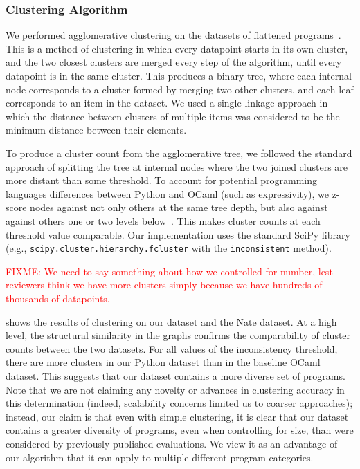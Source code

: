 \documentclass[conference]{IEEEtran}
\newcommand{\fixme}[1]{\textcolor{red}{FIXME: #1}}
\newcommand\lt[1]{{\lstinline|#1|}}
\begin{document}
\subsubsection{Clustering Algorithm}

We performed agglomerative clustering on the
datasets of flattened programs~\cite{modern-clustering}.
This is a method of clustering in which every datapoint starts in its own
cluster, and the two closest clusters are merged every step of the algorithm,
until every datapoint is in the same cluster. This produces a binary tree, where
each internal node corresponds to a cluster formed by merging two other clusters,
and each leaf corresponds to an item in the dataset. We used a single linkage
approach in which the distance between clusters of multiple items was considered
to be the minimum distance between their elements.

To produce a cluster count from the agglomerative tree, we followed the
standard approach of splitting the tree at internal nodes where the two
joined clusters are more distant than some threshold. To account for
potential programming languages differences between Python and OCaml (such
as expressivity), we z-score nodes against not only others at the same tree
depth, but also against against others one or two levels
below~\cite{inconsistent}. This makes cluster counts at each threshold
value comparable. Our implementation uses the standard
SciPy library (e.g., \lt{scipy.cluster.hierarchy.fcluster} with the
\lt{inconsistent} method).

\fixme{We need to say something about how we controlled for number, lest
reviewers think we have more clusters simply because we have hundreds of
thousands of datapoints.}

 shows the results of clustering on our dataset and the
Nate dataset. At a high level, the structural similarity in the graphs
confirms the comparability of cluster counts between the two datasets.  For
all values of the inconsistency threshold, there are more clusters in our
Python dataset than in the baseline OCaml dataset. This suggests that our
dataset contains a more diverse set of programs. Note that we are not
claiming any novelty or advances in clustering accuracy in this
determination (indeed, scalability concerns limited us to coarser
approaches); instead, our claim is that even with simple clustering,
it is clear that our dataset contains a greater diversity of programs, even
when controlling for size, than were considered by previously-published
evaluations. We view it as an advantage of our algorithm that it can apply
to multiple different program categories.
\end{document}

